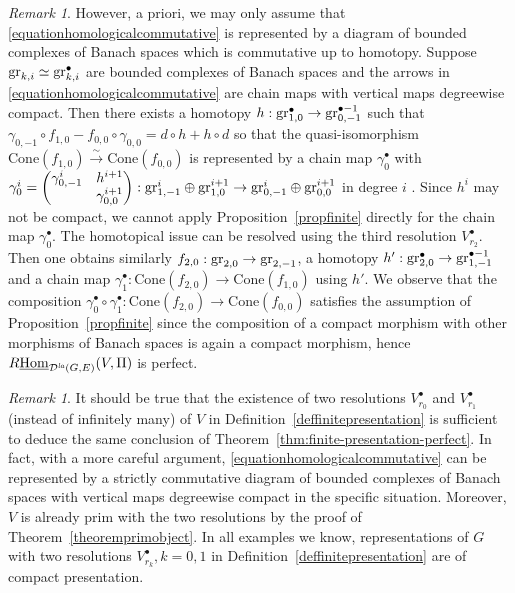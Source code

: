 \documentclass[a4paper,10pt]{amsart}
\theoremstyle{remark}
\newtheorem{remark}[theorem]{Remark}
\theoremstyle{definition}
\theoremstyle{plain}
\numberwithin{equation}{section}
\newcommand{\calD}{{\mathcal D}}
\newcommand{\gr}{{\rm gr}}
\newcommand{\Hom}{{\rm Hom}}
\newcommand{\la}{{\it la}}
\newcommand{\Cone}{\mathrm{Cone}}
\begin{document}
\begin{remark}
However, a priori, we may only assume that \eqref{equationhomologicalcommutative} is represented by a diagram of bounded complexes of Banach spaces which is commutative up to homotopy. Suppose $\gr_{k,i}\simeq \gr_{k,i}^{\bullet}$ are bounded complexes of Banach spaces and the arrows in \eqref{equationhomologicalcommutative} are chain maps with vertical maps degreewise compact. Then there exists a homotopy $h:\gr_{1,0}^{\bullet}\rightarrow \gr_{0,-1}^{\bullet-1}$ such that $\gamma_{0,-1}\circ f_{1,0}-f_{0,0}\circ \gamma_{0,0}=d\circ h+h\circ d$ so that the quasi-isomorphism $\Cone(f_{1,0})\xrightarrow{\sim} \Cone(f_{0,0})$ is represented by a chain map $\gamma_0^{\bullet}$ with $\gamma_0^{i}=\begin{pmatrix}
\gamma_{0,-1}^{i}&h^{i+1}\\&\gamma_{0,0}^{i+1}
\end{pmatrix}:\gr_{1,-1}^{i}\oplus \gr_{1,0}^{i+1}\rightarrow \gr_{0,-1}^{i}\oplus \gr_{0,0}^{i+1}$ in degree $i$ \cite[\href{https://stacks.math.columbia.edu/tag/014F}{Tag 014F}]{stacks-project}. Since $h^i$ may not be compact, we cannot apply Proposition~\ref{propfinite} directly for the chain map $\gamma_0^{\bullet}$. The homotopical issue can be resolved using the third resolution $V_{r_2}^{\bullet}$. Then one obtains similarly $f_{2,0}:\gr_{2,0}\rightarrow \gr_{2,-1}$, a homotopy $h':\gr_{2,0}^{\bullet}\rightarrow \gr_{1,-1}^{\bullet-1}$ and a chain map $\gamma_1^{\bullet}:\Cone(f_{2,0})\rightarrow \Cone(f_{1,0})$ using $h'$. We observe that the composition $\gamma_0^{\bullet}\circ\gamma_1^{\bullet}:\Cone(f_{2,0})\rightarrow \Cone(f_{0,0})$ satisfies the assumption of Proposition~\ref{propfinite} since the composition of a compact morphism with other morphisms of Banach spaces is again a compact morphism, hence $R\underline{\Hom}_{\calD^{\la}(G,E)}(V,\Pi)$ is perfect.
\end{remark}
\begin{remark}\label{remarktworesolution}
	It should be true that the existence of two resolutions $V_{r_0}^{\bullet}$ and $V_{r_1}^{\bullet}$ (instead of infinitely many) of $V$ in Definition~\ref{deffinitepresentation} is sufficient to deduce the same conclusion of Theorem~\ref{thm:finite-presentation-perfect}. In fact, with a more careful argument, \eqref{equationhomologicalcommutative} can be represented by a strictly commutative diagram of bounded complexes of Banach spaces with vertical maps degreewise compact in the specific situation. Moreover, $V$ is already prim with the two resolutions by the proof of Theorem~\ref{theoremprimobject}. In all examples we know, representations of $G$ with two resolutions $V_{r_k}^{\bullet},k=0,1$ in Definition~\ref{deffinitepresentation} are of compact presentation. 
\end{remark}
\end{document}
